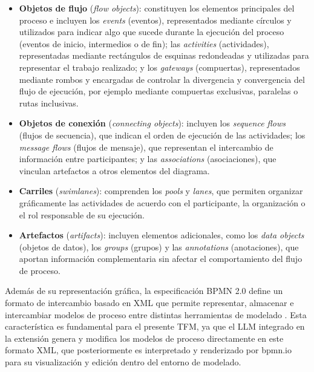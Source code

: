 \begin{itemize}
    \item[$\bullet$] \textbf{Objetos de flujo} (\textit{flow objects}): constituyen los elementos principales del proceso e incluyen los \textit{events} (eventos), representados mediante círculos y  utilizados para  indicar algo que sucede durante la ejecución del proceso (eventos de inicio,  intermedios o de fin); las \textit{activities} (actividades), representadas mediante rectángulos de esquinas redondeadas y  utilizadas para  representar el trabajo realizado; y los \textit{gateways} (compuertas), representados mediante rombos y  encargadas de  controlar la divergencia y convergencia del flujo  de ejecución, por ejemplo mediante compuertas exclusivas, paralelas o rutas inclusivas.
    
    \item[$\bullet$] \textbf{Objetos de conexión} (\textit{connecting objects}): incluyen los \textit{sequence flows} (flujos de secuencia), que indican el orden de ejecución de las actividades; los \textit{message flows} (flujos de mensaje), que representan el intercambio de información entre participantes; y las \textit{associations} (asociaciones), que vinculan artefactos a otros elementos del diagrama.
    
    \item[$\bullet$] \textbf{Carriles} (\textit{swimlanes}):  comprenden los \textit{pools} y \textit{lanes}, que permiten organizar gráficamente las actividades  de acuerdo con  el participante, la organización o el rol responsable de su ejecución.
    
    \item[$\bullet$] \textbf{Artefactos} (\textit{artifacts}):  incluyen elementos adicionales, como los \textit{data objects} (objetos de datos), los \textit{groups} (grupos) y  las \textit{annotations} (anotaciones), que aportan información complementaria sin afectar  el comportamiento del  flujo de proceso.
\end{itemize}

Además de su representación gráfica, la especificación BPMN 2.0 define un formato de intercambio basado en XML que permite representar, almacenar e intercambiar modelos de proceso entre distintas herramientas de modelado \cite{omg2011bpmn}. Esta  característica es fundamental para el presente TFM, ya que el LLM integrado en la extensión genera y modifica los modelos de proceso directamente en este formato XML, que posteriormente es interpretado y renderizado por bpmn.io para su visualización y edición dentro del entorno de modelado.


